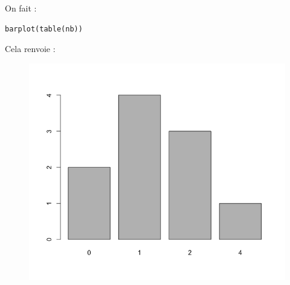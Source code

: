\begin{itemize}
On fait :
\begin{lstlisting}[language=html]
barplot(table(nb))
\end{lstlisting}
Cela renvoie :
\begin{figure}[H]\begin{center}\includegraphics[scale=0.4]{ilu/gra32.png}\end{center}\end{figure}
\end{itemize}

